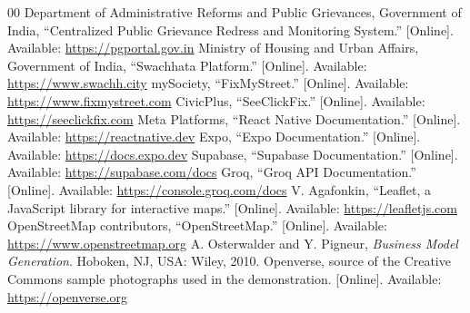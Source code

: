 \documentclass[conference,a4paper]{IEEEtran}
\begin{document}
\begin{thebibliography}{00}
 Department of Administrative Reforms and Public Grievances, Government of India, ``Centralized Public Grievance Redress and Monitoring System.'' [Online]. Available: \url{https://pgportal.gov.in}
 Ministry of Housing and Urban Affairs, Government of India, ``Swachhata Platform.'' [Online]. Available: \url{https://www.swachh.city}
 mySociety, ``FixMyStreet.'' [Online]. Available: \url{https://www.fixmystreet.com}
 CivicPlus, ``SeeClickFix.'' [Online]. Available: \url{https://seeclickfix.com}
 Meta Platforms, ``React Native Documentation.'' [Online]. Available: \url{https://reactnative.dev}
 Expo, ``Expo Documentation.'' [Online]. Available: \url{https://docs.expo.dev}
 Supabase, ``Supabase Documentation.'' [Online]. Available: \url{https://supabase.com/docs}
 Groq, ``Groq API Documentation.'' [Online]. Available: \url{https://console.groq.com/docs}
 V. Agafonkin, ``Leaflet, a JavaScript library for interactive maps.'' [Online]. Available: \url{https://leafletjs.com}
 OpenStreetMap contributors, ``OpenStreetMap.'' [Online]. Available: \url{https://www.openstreetmap.org}
 A. Osterwalder and Y. Pigneur, \textit{Business Model Generation}. Hoboken, NJ, USA: Wiley, 2010.
 Openverse, source of the Creative Commons sample photographs used in the demonstration. [Online]. Available: \url{https://openverse.org}
\end{thebibliography}
\end{document}
